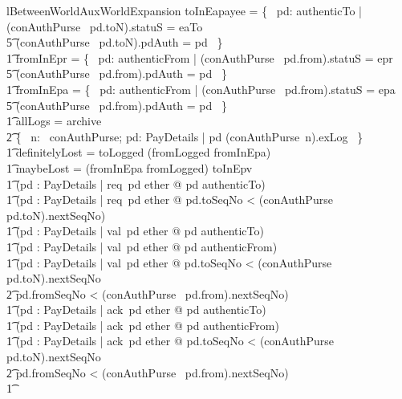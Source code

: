 \begin{LNewLemma}
\begin{theorem}{lBetweenWorldAuxWorldExpansion}
            toInEapayee = \{~ pd: authenticTo | (conAuthPurse~ pd.toN).statuS = eaTo \\
                    \t5 \land (conAuthPurse~ pd.toN).pdAuth = pd ~\} \land \\ \t1
            fromInEpr = \{~ pd: authenticFrom | (conAuthPurse~ pd.from).statuS = epr \\
                    \t5 \land (conAuthPurse~ pd.from).pdAuth = pd ~\} \land \\ \t1
            fromInEpa = \{~ pd: authenticFrom | (conAuthPurse~ pd.from).statuS = epa \\
                    \t5 \land (conAuthPurse~ pd.from).pdAuth = pd ~\} \land \\ \t1
            allLogs = archive \cup \\
                \t2 \{~ n: \dom~conAuthPurse; pd: PayDetails | pd \in (conAuthPurse~n).exLog ~\} \land \\ \t1
            definitelyLost = toLogged \cap (fromLogged \cup fromInEpa) \land \\ \t1
            maybeLost = (fromInEpa \cup fromLogged) \cap toInEpv \land \\
    \t1
            (\forall pd : PayDetails | req~pd \in ether @ pd \in authenticTo)
            \land \\ \t1
            (\forall pd : PayDetails | req~pd \in ether @
                 pd.toSeqNo < (conAuthPurse~ pd.toN).nextSeqNo) \\ \t1
            \land
            (\forall pd : PayDetails | val~pd \in ether @ pd \in authenticTo) \land \\ \t1
            (\forall pd : PayDetails | val~pd \in ether @ pd \in authenticFrom) \land \\ \t1
            (\forall pd : PayDetails | val~pd \in ether @ pd.toSeqNo < (conAuthPurse~ pd.toN).nextSeqNo \\
                \t2 \land pd.fromSeqNo < (conAuthPurse~ pd.from).nextSeqNo) \land \\ \t1
            (\forall pd : PayDetails | ack~pd \in ether @ pd \in authenticTo)\land  \\ \t1
            (\forall pd : PayDetails | ack~pd \in ether @ pd \in authenticFrom) \land \\ \t1
            (\forall pd : PayDetails | ack~pd \in ether @ pd.toSeqNo < (conAuthPurse~ pd.toN).nextSeqNo  \\ %
                \t2 \land pd.fromSeqNo < (conAuthPurse~ pd.from).nextSeqNo) \land \\ \t1

\end{theorem}
\end{LNewLemma}
